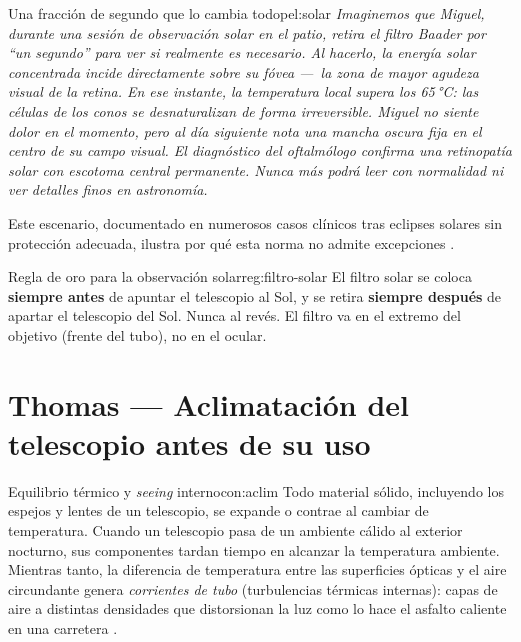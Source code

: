 \documentclass[12pt,oneside]{book}
\begin{document}
\begin{peligro}{Una fracción de segundo que lo cambia todo}{pel:solar}
    \itshape
    Imaginemos que Miguel, durante una sesión de observación solar en el patio,
    retira el filtro Baader por \emph{``un segundo''} para ver si realmente es
    necesario. Al hacerlo, la energía solar concentrada incide directamente sobre
    su fóvea —~la zona de mayor agudeza visual de la retina. En ese instante,
    la temperatura local supera los 65\,°C: las células de los conos se desnaturalizan
    de forma irreversible. Miguel no siente dolor en el momento, pero al día siguiente
    nota una mancha oscura fija en el centro de su campo visual. El diagnóstico del
    oftalmólogo confirma una \emph{retinopatía solar} con escotoma central permanente.
    Nunca más podrá leer con normalidad ni ver detalles finos en astronomía.

    \medskip
    \normalfont
    Este escenario, documentado en numerosos casos clínicos tras eclipses solares
    sin protección adecuada, ilustra por qué esta norma no admite excepciones
    \cite{dobson2011,pasachoff2000}.
\end{peligro}

\begin{regla}{Regla de oro para la observación solar}{reg:filtro-solar}
    El filtro solar se coloca \textbf{siempre antes} de apuntar el telescopio al
    Sol, y se retira \textbf{siempre después} de apartar el telescopio del Sol.
    Nunca al revés. El filtro va en el extremo del objetivo (frente del tubo),
    no en el ocular.
\end{regla}

\section{Thomas — Aclimatación del telescopio antes de su uso}

\begin{concepto}{Equilibrio térmico y \emph{seeing} interno}{con:aclim}
    Todo material sólido, incluyendo los espejos y lentes de un telescopio, se
    expande o contrae al cambiar de temperatura. Cuando un telescopio pasa de un
    ambiente cálido al exterior nocturno, sus componentes tardan tiempo en alcanzar
    la temperatura ambiente. Mientras tanto, la diferencia de temperatura entre las
    superficies ópticas y el aire circundante genera \emph{corrientes de tubo}
    (turbulencias térmicas internas): capas de aire a distintas densidades que
    distorsionan la luz como lo hace el asfalto caliente en una carretera \cite{suiter1994}.
\end{concepto}
\end{document}
